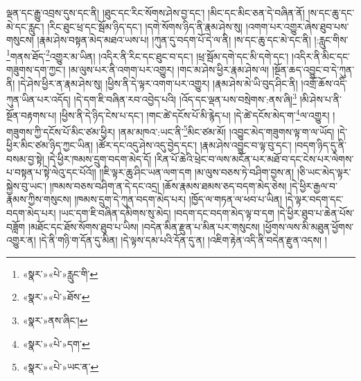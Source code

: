 ལྡན་དང་རྒྱུ་འབྲས་དུས་དང་ནི། །ཐུང་དང་རིང་སོགས་ཤེས་བྱ་དང་། །མིང་དང་མིང་ཅན་དེ་བཞིན་ནོ། །ས་དང་ཆུ་དང་མེ་དང་རླུང་། །རིང་ཐུང་ཕྲ་དང་སྦོམ་ཉིད་དང་། །དགེ་སོགས་ཉིད་ནི་རྣམ་ཤེས་སུ། །འགག་པར་འགྱུར་ཞེས་ཐུབ་པས་གསུངས། །རྣམ་ཤེས་བསྟན་མེད་མཐའ་ཡས་པ། །ཀུན་དུ་བདག་པོ་དེ་ལ་ནི། །ས་དང་ཆུ་དང་མེ་དང་ནི། །:རླུང་གིས་\footnote{«སྣར་»«པེ་»རླུང་གི་}གནས་ཐོད་\footnote{«སྣར་»«པེ་»ཐོས་}འགྱུར་མ་ཡིན། །འདིར་ནི་རིང་དང་ཐུང་བ་དང་། །ཕྲ་སྦོམ་དགེ་དང་མི་དགེ་དང་། །འདིར་ནི་མིང་དང་གཟུགས་དག་ཀྱང་། །མ་ལུས་པར་ནི་འགག་པར་འགྱུར། །གང་མ་ཤེས་ཕྱིར་རྣམ་ཤེས་ལ། །སྔོན་ཆད་འབྱུང་བ་དེ་ཀུན་ནི། །དེ་ཤེས་ཕྱིར་ན་རྣམ་ཤེས་སུ། །ཕྱིས་ནི་དེ་ལྟར་འགག་པར་འགྱུར། །རྣམ་ཤེས་མེ་ཡི་བུད་ཤིང་ནི། །འགྲོ་ཆོས་འདི་ཀུན་ཡིན་པར་འདོད། །དེ་དག་ཇི་བཞིན་རབ་འབྱེད་པའི། །འོད་དང་ལྡན་པས་བསྲེགས་:ནས་ཞི།\footnote{«སྣར་»ནས་ཞིང་།} །མི་ཤེས་པ་ནི་སྔོན་བརྟགས་པ། །ཕྱིས་ནི་དེ་ཉིད་ངེས་པ་དང་། །གང་ཚེ་དངོས་པོ་མི་རྙེད་པ། །དེ་ཚེ་དངོས་མེད་ག་\footnote{«སྣར་»«པེ་»དག་}ལ་འགྱུར། །གཟུགས་ཀྱི་དངོས་པོ་མིང་ཙམ་ཕྱིར། །ནམ་མཁའ་:ཡང་ནི་\footnote{«སྣར་»«པེ་»ཡང་ན་}མིང་ཙམ་མོ། །འབྱུང་མེད་གཟུགས་ལྟ་ག་ལ་ཡོད། །དེ་ཕྱིར་མིང་ཙམ་ཉིད་ཀྱང་ཡིན། །ཚོར་དང་འདུ་ཤེས་འདུ་བྱེད་དང་། །རྣམ་ཤེས་འབྱུང་བ་ལྟ་བུ་དང་། །བདག་ཉིད་དུ་ནི་བསམ་བྱ་སྟེ། །དེ་ཕྱིར་ཁམས་དྲུག་བདག་མེད་དོ། །རིན་པོ་ཆེའི་ཕྲེང་བ་ལས་མངོན་པར་མཐོ་བ་དང་ངེས་པར་ལེགས་པ་བསྟན་པ་སྟེ་ལེའུ་དང་པོའོ།། །།ཇི་ལྟར་ཆུ་ཤིང་ཡན་ལག་དག །མ་ལུས་བཅས་ཏེ་བཤིག་བྱས་ན། །ཅི་ཡང་མེད་ལྟར་སྐྱེས་བུ་ཡང་། །ཁམས་བཅས་བཤིག་ན་དེ་དང་འདྲ། །ཆོས་རྣམས་ཐམས་ཅད་བདག་མེད་ཅེས། །དེ་ཕྱིར་རྒྱལ་བ་རྣམས་ཀྱིས་གསུངས། །ཁམས་དྲུག་དེ་ཀུན་བདག་མེད་པར། །ཁྱོད་ལ་གཏན་ལ་ཕབ་པ་ཡིན། །དེ་ལྟར་བདག་དང་བདག་མེད་པར། །ཡང་དག་ཇི་བཞིན་དམིགས་སུ་མེད། །བདག་དང་བདག་མེད་ལྟ་བ་དག །དེ་ཕྱིར་ཐུབ་པ་ཆེན་པོས་བཟློག །མཐོང་དང་ཐོས་སོགས་ཐུབ་པ་ཡིས། །བདེན་མིན་རྫུན་པ་མིན་པར་གསུངས། །ཕྱོགས་ལས་མི་མཐུན་ཕྱོགས་འགྱུར་ན། །དེ་ནི་གཉི་ག་དོན་དུ་མིན། །དེ་ལྟས་དམ་པའི་དོན་དུ་ན། །འཇིག་རྟེན་འདི་ནི་བདེན་རྫུན་འདས། །
